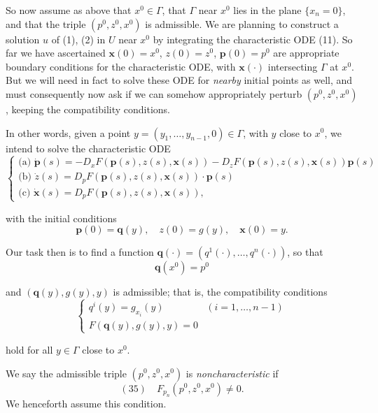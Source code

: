 So now assume as above that $x^0 \in \Gamma$, that $\Gamma$ near $x^0$ lies in the plane $\{x_n = 0\}$, and that the triple $(p^0, z^0, x^0)$ is admissible. We are planning to construct a solution $u$ of (1), (2) in $U$ near $x^0$ by integrating the characteristic ODE (11). So far we have ascertained $\mathbf{x}(0) = x^0$, $z(0) = z^0$, $\mathbf{p}(0) = p^0$ are appropriate boundary conditions for the characteristic ODE, with $\mathbf{x}(\cdot)$ intersecting $\Gamma$ at $x^0$. But we will need in fact to solve these ODE for \textit{nearby} initial points as well, and must consequently now ask if we can somehow appropriately perturb $(p^0, z^0, x^0)$, keeping the compatibility conditions.

In other words, given a point $y = (y_1, \ldots, y_{n-1}, 0) \in \Gamma$, with $y$ close to $x^0$, we intend to solve the characteristic ODE
$$\begin{cases}
\text{(a) } \dot{\mathbf{p}}(s) = -D_x F(\mathbf{p}(s), z(s), \mathbf{x}(s)) - D_z F(\mathbf{p}(s), z(s), \mathbf{x}(s))\mathbf{p}(s) \\
\text{(b) } \dot{z}(s) = D_p F(\mathbf{p}(s), z(s), \mathbf{x}(s)) \cdot \mathbf{p}(s) \\
\text{(c) } \dot{\mathbf{x}}(s) = D_p F(\mathbf{p}(s), z(s), \mathbf{x}(s)),
\end{cases}$$

with the initial conditions
$$\mathbf{p}(0) = \mathbf{q}(y), \quad z(0) = g(y), \quad \mathbf{x}(0) = y.$$

Our task then is to find a function $\mathbf{q}(\cdot) = (q^1(\cdot), \ldots, q^n(\cdot))$, so that
$$\mathbf{q}(x^0) = p^0$$

and $(\mathbf{q}(y), g(y), y)$ is admissible; that is, the compatibility conditions
$$\begin{cases}
q^i(y) = g_{x_i}(y) & (i = 1, \ldots, n-1) \\
F(\mathbf{q}(y), g(y), y) = 0
\end{cases}$$

hold for all $y \in \Gamma$ close to $x^0$.

\begin{definition}
\label{def:noncharacteristic-triple}
We say the admissible triple $(p^0, z^0, x^0)$ is \textit{noncharacteristic} if
$$(35) \quad F_{p_n}(p^0, z^0, x^0) \neq 0.$$
We henceforth assume this condition.
\end{definition}

